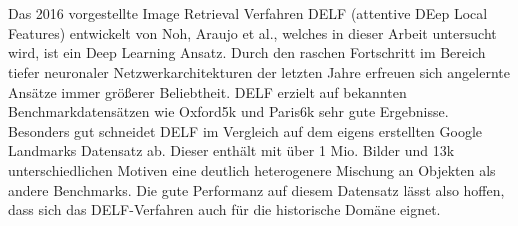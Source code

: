 \\\\
Das 2016 vorgestellte Image Retrieval Verfahren DELF (attentive DEep Local Features) \cite{delf} entwickelt von Noh, \mbox{Araujo} et al., welches in dieser Arbeit untersucht wird, ist ein Deep Learning Ansatz. Durch den raschen Fortschritt im Bereich tiefer neuronaler Netzwerkarchitekturen der letzten Jahre erfreuen sich angelernte Ansätze immer größerer Beliebtheit. DELF erzielt auf bekannten Benchmarkdatensätzen wie Oxford5k \cite{oxford5k} und Paris6k \cite{paris6k} sehr gute Ergebnisse. Besonders gut schneidet DELF im Vergleich auf dem eigens erstellten Google Landmarks Datensatz \cite{landmarks} ab. Dieser enthält mit über 1 Mio. Bilder und 13k unterschiedlichen Motiven eine deutlich heterogenere Mischung an Objekten als andere Benchmarks. Die gute Performanz auf diesem Datensatz lässt also hoffen, dass sich das DELF-Verfahren auch für die historische Domäne eignet.



